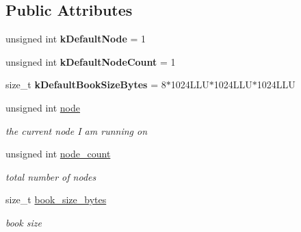 \subsection*{Public Attributes}
\begin{DoxyCompactItemize}
\item 
unsigned int {\bfseries k\+Default\+Node} = 1\hypertarget{structalps_1_1LfsOptions_aaf7557c460b91aa0e95f65e278835cf9}{}\label{structalps_1_1LfsOptions_aaf7557c460b91aa0e95f65e278835cf9}

\item 
unsigned int {\bfseries k\+Default\+Node\+Count} = 1\hypertarget{structalps_1_1LfsOptions_a7140a100f93b6d6fadfbb862c68d7236}{}\label{structalps_1_1LfsOptions_a7140a100f93b6d6fadfbb862c68d7236}

\item 
size\+\_\+t {\bfseries k\+Default\+Book\+Size\+Bytes} = 8$\ast$1024\+L\+L\+U$\ast$1024\+L\+L\+U$\ast$1024\+L\+LU\hypertarget{structalps_1_1LfsOptions_a9675c2acbb53dc6bd54b204e05d17208}{}\label{structalps_1_1LfsOptions_a9675c2acbb53dc6bd54b204e05d17208}

\item 
unsigned int \hyperlink{structalps_1_1LfsOptions_ac08ad865ec69ce34c96e13f8de1c105e}{node}\hypertarget{structalps_1_1LfsOptions_ac08ad865ec69ce34c96e13f8de1c105e}{}\label{structalps_1_1LfsOptions_ac08ad865ec69ce34c96e13f8de1c105e}

\begin{DoxyCompactList}\small\item\em the current node I am running on \end{DoxyCompactList}\item 
unsigned int \hyperlink{structalps_1_1LfsOptions_a4961c4b5c1497f9d4e740b7ceed168d5}{node\+\_\+count}\hypertarget{structalps_1_1LfsOptions_a4961c4b5c1497f9d4e740b7ceed168d5}{}\label{structalps_1_1LfsOptions_a4961c4b5c1497f9d4e740b7ceed168d5}

\begin{DoxyCompactList}\small\item\em total number of nodes \end{DoxyCompactList}\item 
size\+\_\+t \hyperlink{structalps_1_1LfsOptions_ae8fd697e267bf399031e91b6aa0917b1}{book\+\_\+size\+\_\+bytes}\hypertarget{structalps_1_1LfsOptions_ae8fd697e267bf399031e91b6aa0917b1}{}\label{structalps_1_1LfsOptions_ae8fd697e267bf399031e91b6aa0917b1}

\begin{DoxyCompactList}\small\item\em book size \end{DoxyCompactList}\end{DoxyCompactItemize}
